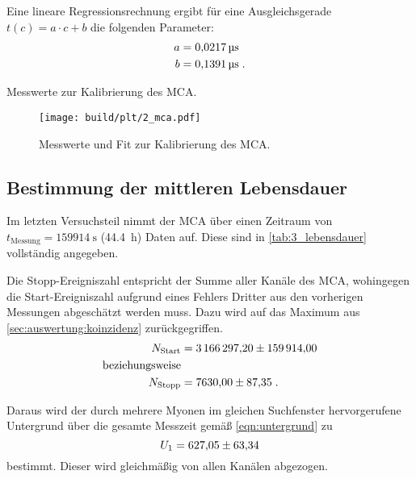 Eine lineare Regressionsrechnung ergibt
für eine Ausgleichsgerade $t(c) = a \cdot c + b$
die folgenden Parameter:
\begin{align*}
    a &=\SI{0.0217 \pm 0}{\micro\second} \\
    b &=\SI{0.1391 \pm 0}{\micro\second} \; .
\end{align*}

\begin{table}
    \centering
    \caption{Messwerte zur Kalibrierung des \ac{MCA}.}
    \label{tab:2_mca}
\end{table}

\begin{figure}
    \centering
    \texttt{[image: build/plt/2\_mca.pdf]}
    \caption{Messwerte und Fit zur Kalibrierung des \ac{MCA}.}
    \label{fig:plt:2_mca}
\end{figure}


\FloatBarrier
\subsection{Bestimmung der mittleren Lebensdauer} \label{sec:auswertung:lebensdauer}
Im letzten Versuchsteil nimmt der \ac{MCA} über einen Zeitraum von $t_\text{Messung} = \SI{159914}{\second}$ (\SI{44.4}{\hour}) Daten auf.
Diese sind in \autoref{tab:3_lebensdauer} vollständig angegeben.


Die Stopp-Ereigniszahl entspricht der Summe aller Kanäle des \ac{MCA}, %
wohingegen die Start-Ereigniszahl aufgrund eines Fehlers Dritter aus den vorherigen Messungen abgeschätzt werden muss.
Dazu wird auf das Maximum aus \autoref{sec:auswertung:koinzidenz} zurückgegriffen.
\begin{align*}
    N_\text{Start} &= \num{3166297.20 \pm 159914.00} \\
    \text{beziehungsweise} \\
    N_\text{Stopp} &= \num{7630.00 \pm 87.35} \; .
\end{align*}

Daraus wird der durch mehrere Myonen im gleichen Suchfenster hervorgerufene Untergrund über die gesamte Messzeit
gemäß \autoref{eqn:untergrund} zu
\[
    U_1 = \num{627.05 \pm 63.34}
\]
bestimmt.
Dieser wird gleichmäßig von allen Kanälen abgezogen.

